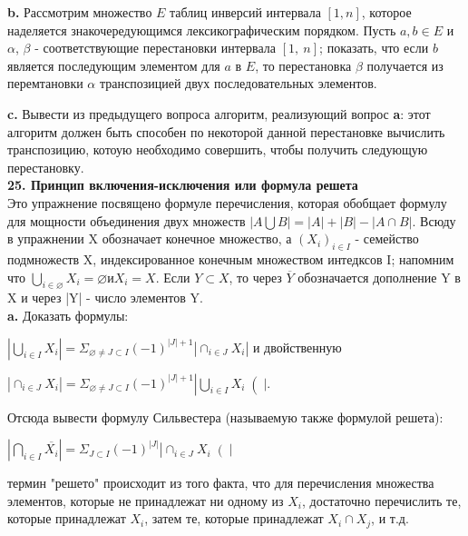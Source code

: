 \documentclass{mai_book}
\begin{document}
\textbf{b.} Рассмотрим множество $E$ таблиц инверсий интервала $[1, n]$, которое наделяется знакочередующимся лексикографическим порядком. Пусть $a,b \in E$ и $\alpha$, $\beta$ - соответствующие перестановки интервала $[1,\: n]$; показать, что если $b$ является последующим элементом для $a$ в $E$, то перестановка $\beta$ получается из перемтановки $\alpha$ транспозицией двух последовательных элементов.\\
\newpage

\textbf{c.} Вывести из предыдущего вопроса алгоритм, реализующий вопрос \textbf{a}: этот алгоритм должен быть способен по некоторой данной перестановке вычислить транспозицию, котоую необходимо совершить, чтобы получить следующую перестановку.\\

\noindent
\textbf{25. Принцип включения-исключения или формула решета}\\

Это упражнение посвящено формуле перечисления, которая обобщает формулу для мощности объединения двух множеств $|A \bigcup B| = |A| + |B| - |A \cap B|$. Всюду в упражнении X обозначает конечное множество, а $(X_{i})_{i \in I}$ - семейство подмножеств X, индексированное конечным множеством интедксов I; напомним что $\bigcup _{i \in \varnothing} X_{i} = \varnothing и X_{i} = X.$ Если $Y \subset X$, то через $\overline{Y}$ обозначается дополнение Y в X и через |Y| - число элементов Y.\\

\textbf{a.} Доказать формулы:
\begin{center}
$\left|\bigcup_{i\in I} X_{i}\right| = \Sigma_{\varnothing \neq J \subset I} (-1)^{|J|+1 } \left|\cap_{i \in J} X_{i}\right| $ и двойственную
\end{center}
\begin{center}
$\left|\cap_{i \in J} X_{i}\right| = \Sigma_{\varnothing \neq J \subset I} (-1)^{|J|+1 } \left|\bigcup_{i \in I} X_{i}\right(|.$
\end{center}
Отсюда вывести формулу Сильвестера (называемую также формулой решета):
\begin{center}
$\left|\bigcap_{i \in I} \overline{X_{i}}\right| = \Sigma_{J \subset I} (-1)^{|J|} \left|\cap_{i \in J} X_{i}\right(|$
\end{center}
термин "решето" происходит из того факта, что для перечисления множества элементов, которые не принадлежат ни одному из $X_{i}$, достаточно перечислить те, которые принадлежат $X_{i}$, затем те, которые принадлежат $X_{i} \cap X_{j}$, и т.д.\\
\end{document}
